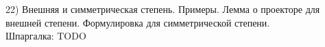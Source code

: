 22) Внешняя и симметрическая степень. Примеры. Лемма о проекторе для внешней степени. Формулировка для симметрической степени.\\
Шпаргалка: TODO\\
